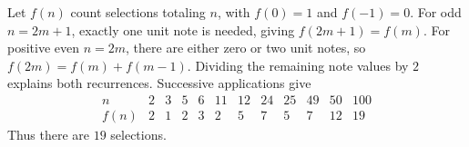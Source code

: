 Let $f(n)$ count selections totaling $n$, with $f(0)=1$ and $f(-1)=0$. For odd $n=2m+1$, exactly one unit note is needed, giving $f(2m+1)=f(m)$. For positive even $n=2m$, there are either zero or two unit notes, so $f(2m)=f(m)+f(m-1)$. Dividing the remaining note values by $2$ explains both recurrences. Successive applications give
\[
\begin{array}{c|rrrrrrrrrrr}n&2&3&5&6&11&12&24&25&49&50&100\\\hline
f(n)&2&1&2&3&2&5&7&5&7&12&19\end{array}
\]
Thus there are $\boxed{19}$ selections.
